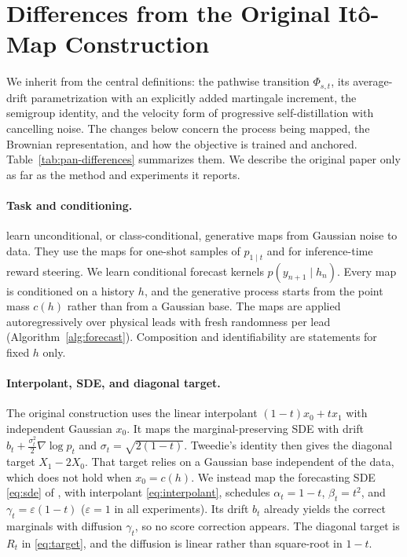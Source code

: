 \section{Differences from the Original It\^o-Map Construction}\label{app:pan-differences}
We inherit from \citet{pan2026itomaps} the central definitions: the pathwise transition $\Phi_{s,t}$, its average-drift parametrization with an explicitly added martingale increment, the semigroup identity, and the velocity form of progressive self-distillation with cancelling noise. The changes below concern the process being mapped, the Brownian representation, and how the objective is trained and anchored. Table~\ref{tab:pan-differences} summarizes them. We describe the original paper only as far as the method and experiments it reports.

\paragraph{Task and conditioning.} \citet{pan2026itomaps} learn unconditional, or class-conditional, generative maps from Gaussian noise to data. They use the maps for one-shot samples of $p_{1\mid t}$ and for inference-time reward steering. We learn conditional forecast kernels $p(y_{n+1}\mid h_n)$. Every map is conditioned on a history $h$, and the generative process starts from the point mass $c(h)$ rather than from a Gaussian base. The maps are applied autoregressively over physical leads with fresh randomness per lead (Algorithm~\ref{alg:forecast}). Composition and identifiability are statements for fixed $h$ only.

\paragraph{Interpolant, SDE, and diagonal target.} The original construction uses the linear interpolant $(1-t)x_0+tx_1$ with independent Gaussian $x_0$. It maps the marginal-preserving SDE with drift $b_t+\frac{\sigma_t^2}{2}\nabla\log p_t$ and $\sigma_t=\sqrt{2(1-t)}$. Tweedie's identity then gives the diagonal target $X_1-2X_0$. That target relies on a Gaussian base independent of the data, which does not hold when $x_0=c(h)$. We instead map the forecasting SDE \eqref{eq:sde} of \citet{chen2024forecasting}, with interpolant \eqref{eq:interpolant}, schedules $\alpha_t=1-t$, $\beta_t=t^2$, and $\gamma_t=\varepsilon(1-t)$ ($\varepsilon=1$ in all experiments). Its drift $b_t$ already yields the correct marginals with diffusion $\gamma_t$, so no score correction appears. The diagonal target is $R_t$ in \eqref{eq:target}, and the diffusion is linear rather than square-root in $1-t$.

